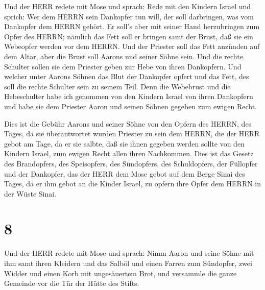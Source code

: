  Und der HERR redete mit Mose und sprach: 
Rede mit den Kindern Israel und sprich: Wer dem HERRN sein Dankopfer tun
will, der soll darbringen, was vom Dankopfer dem HERRN gehört.
 Er soll's aber mit seiner Hand herzubringen zum Opfer des
HERRN; nämlich das Fett soll er bringen samt der Brust, daß sie ein
Webeopfer werden vor dem HERRN.  Und der Priester soll das
Fett anzünden auf dem Altar, aber die Brust soll Aarons und seiner Söhne
sein.  Und die rechte Schulter sollen sie dem Priester
geben zur Hebe von ihren Dankopfern.  Und welcher unter
Aarons Söhnen das Blut der Dankopfer opfert und das Fett, des soll die
rechte Schulter sein zu seinem Teil.  Denn die Webebrust
und die Hebeschulter habe ich genommen von den Kindern Israel von ihren
Dankopfern und habe sie dem Priester Aaron und seinen Söhnen gegeben zum
ewigen Recht.

 Dies ist die Gebühr Aarons und seiner Söhne von den Opfern
des HERRN, des Tages, da sie überantwortet wurden Priester zu sein dem
HERRN,  die der HERR gebot am Tage, da er sie salbte, daß
sie ihnen gegeben werden sollte von den Kindern Israel, zum ewigen Recht
allen ihren Nachkommen.  Dies ist das Gesetz des
Brandopfers, des Speisopfers, des Sündopfers, des Schuldopfers, der
Füllopfer und der Dankopfer,  das der HERR dem Mose gebot
auf dem Berge Sinai des Tages, da er ihm gebot an die Kinder Israel, zu
opfern ihre Opfer dem HERRN in der Wüste Sinai.

\hypertarget{section-7}{%
\section{8}\label{section-7}}

 Und der HERR redete mit Mose und sprach:  Nimm
Aaron und seine Söhne mit ihm samt ihren Kleidern und das Salböl und
einen Farren zum Sündopfer, zwei Widder und einen Korb mit ungesäuertem
Brot,  und versammle die ganze Gemeinde vor die Tür der
Hütte des Stifts.

